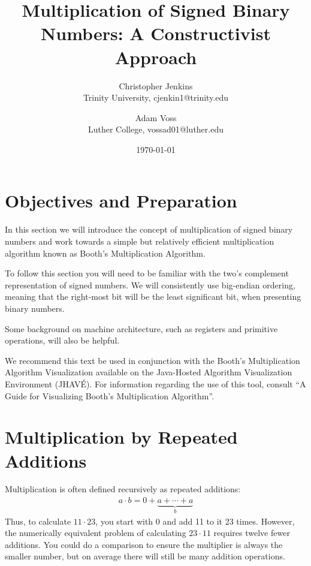 \documentclass{article}
\title{Multiplication of Signed Binary Numbers: A Constructivist Approach}
\date{\today}
\author{Christopher Jenkins\\ Trinity University, cjenkin1@trinity.edu
    \and Adam Voss\\ Luther College, vossad01@luther.edu}
\begin{document}
\maketitle
\tableofcontents

\pagebreak

\section{Objectives and Preparation}
In this section we will introduce the concept of multiplication of signed binary numbers and work towards a simple but relatively efficient multiplication algorithm known as Booth's Multiplication Algorithm.

To follow this section you will need to be familiar with the two's complement representation of signed numbers.
We will consistently use big-endian ordering, meaning that the right-most bit will be the least significant bit, when presenting binary numbers.

Some background on machine architecture, such as registers and primitive operations, will also be helpful.

We recommend this text be used in conjunction with the Booth's Multiplication Algorithm Visualization available on the Java-Hosted Algorithm Visualization Environment (JHAVÉ).
For information regarding the use of this tool, consult ``A Guide for Visualizing Booth's Multiplication Algorithm''.

\section{Multiplication by Repeated Additions} %
Multiplication is often defined recursively as repeated additions: \begin{align}
a \cdot b = 0 + \underbrace{a + \cdots + a}_{b} %
\end{align}
Thus, to calculate $11 \cdot 23$, you start with 0 and add 11 to it 23 times.
However, the numerically equivalent problem of calculating $23 \cdot 11$ requires twelve fewer additions.
You could do a comparison to ensure the multiplier is always the smaller number, but on average there will still be many addition operations.
\end{document}
